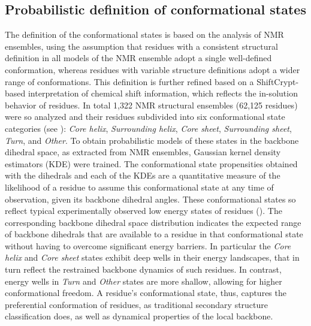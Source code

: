 \subsection{Probabilistic definition of conformational states}

The definition of the conformational states is based on the analysis of NMR ensembles, using the assumption that residues with a consistent structural definition in all models of the NMR ensemble adopt a single well-defined conformation, whereas residues with variable structure definitions adopt a wider range of conformations. This definition is further refined based on a ShiftCrypt-based interpretation of chemical shift information, which reflects the in-solution behavior of residues. In total 1,322 NMR structural ensembles (62,125 residues) were so analyzed and their residues subdivided into six conformational state categories (see ):  \textit{Core helix}, \textit{Surrounding helix}, \textit{Core sheet}, \textit{Surrounding sheet}, \textit{Turn}, and \textit{Other}. To obtain probabilistic models of these states in the backbone dihedral space, as extracted from NMR ensembles, Gaussian kernel density estimators (KDE) were trained. The conformational state propensities obtained with the dihedrals and each of the KDEs are a quantitative measure of the likelihood of a residue to assume this conformational state at any time of observation, given its backbone dihedral angles. These conformational states so reflect typical experimentally observed low energy states of residues (). The corresponding backbone dihedral space distribution indicates the expected range of backbone dihedrals that are available to a residue in that conformational state without having to overcome significant energy barriers. In particular the \textit{Core helix} and \textit{Core sheet} states exhibit deep wells in their energy landscapes, that in turn reflect the restrained backbone dynamics of such residues. In contrast, energy wells in \textit{Turn} and \textit{Other} states are more shallow, allowing for higher conformational freedom. A residue's conformational state, thus, captures the preferential conformation of residues, as traditional secondary structure classification does, as well as dynamical properties of the local backbone.

